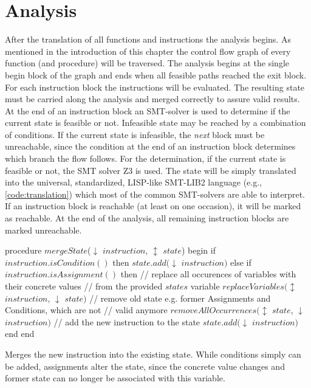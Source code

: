 \section{Analysis}
\label{sec:analysis}
After the translation of all functions and instructions the analysis begins. As mentioned in the introduction of this chapter the control flow graph of every function (and procedure) will be traversed. The analysis begins at the single begin block of the graph and ends when all feasible paths reached the exit block.  
For each instruction block the instructions will be evaluated. The resulting state must be carried along the analysis and merged correctly to assure valid results. At the end of an instruction block an SMT-solver is used to determine if the current state is feasible or not. Infeasible state may be reached by a combination of conditions. If the current state is infeasible, the \emph{next} block must be unreachable, since the condition at the end of an instruction block determines which branch the flow follows. 
For the determination, if the current state is feasible or not, the SMT solver Z3 \cite{demouraZ3EfficientSMT2008} is used. The state will be simply translated into the universal, standardized, LISP-like SMT-LIB2 language (e.g., \ref{code:translation}) which most of the common SMT-solvers are able to interpret. If an instruction block is reachable (at least on one occasion), it will be marked as reachable. At the end of the analysis, all remaining instruction blocks are marked unreachable.
\begin{program}[h!]
	\begin{GenericCode}
procedure $mergeState$($\downarrow$ $instruction$, $\updownarrow$ $state$) begin
	if $instruction.isCondition()$ then
		$state.add($$\downarrow$ $instruction$$)$
	else if $instruction.isAssignment()$ then
		// replace all occurences of variables with their concrete values
		// from the provided $states$ variable
		$replaceVariables($$\updownarrow$ $instruction$, $\downarrow$ $state$$)$ 
		// remove old state e.g. former Assignments and Conditions, which are not
		// valid anymore
		$removeAllOccurrences($$\updownarrow$ $state$, $\downarrow$ $instruction$$)$
		// add the new instruction to the state
		$state.add($$\downarrow$ $instruction$$)$
	end 
end	\end{GenericCode}
	\caption{Merges the new instruction into the existing state. While conditions simply can be added, assignments alter the state, since the concrete value changes and former state can no longer be associated with this variable. }
\label{code:merge state}
\end{program}

